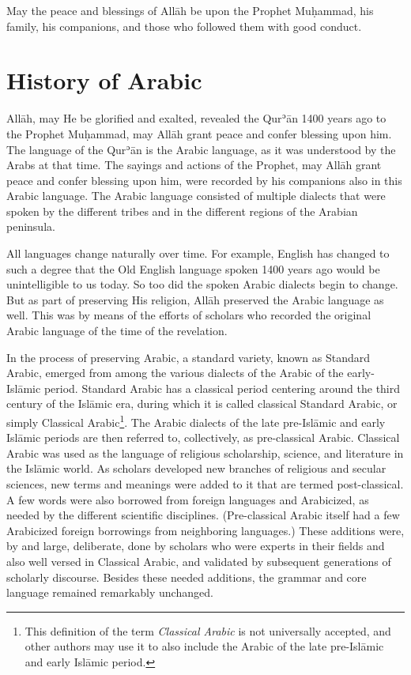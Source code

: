\documentclass[
  10pt,
]{book}
\begin{document}
May the peace and blessings of Allāh be upon the Prophet Muḥammad, his family, his companions, and those who followed them with good conduct.

\section{History of Arabic}\label{history-of-arabic}

Allāh, may He be glorified and exalted, revealed the Qurʾān 1400 years ago to the Prophet Muḥammad, may Allāh grant peace and confer blessing upon him. The language of the Qurʾān is the Arabic language, as it was understood by the Arabs at that time. The sayings and actions of the Prophet, may Allāh grant peace and confer blessing upon him, were recorded by his companions also in this Arabic language. The Arabic language consisted of multiple dialects that were spoken by the different tribes and in the different regions of the Arabian peninsula.

All languages change naturally over time. For example, English has changed to such a degree that the Old English language spoken 1400 years ago would be unintelligible to us today. So too did the spoken Arabic dialects begin to change. But as part of preserving His religion, Allāh preserved the Arabic language as well. This was by means of the efforts of scholars who recorded the original Arabic language of the time of the revelation.

In the process of preserving Arabic, a standard variety, known as Standard Arabic, emerged from among the various dialects of the Arabic of the early-Islāmic period. Standard Arabic has a classical period centering around the third century of the Islāmic era, during which it is called classical Standard Arabic, or simply Classical Arabic\footnote{This definition of the term \emph{Classical Arabic} is not universally accepted, and other authors may use it to also include the Arabic of the late pre-Islāmic and early Islāmic period.}. The Arabic dialects of the late pre-Islāmic and early Islāmic periods are then referred to, collectively, as pre-classical Arabic. Classical Arabic was used as the language of religious scholarship, science, and literature in the Islāmic world. As scholars developed new branches of religious and secular sciences, new terms and meanings were added to it that are termed post-classical. A few words were also borrowed from foreign languages and Arabicized, as needed by the different scientific disciplines. (Pre-classical Arabic itself had a few Arabicized foreign borrowings from neighboring languages.) These additions were, by and large, deliberate, done by scholars who were experts in their fields and also well versed in Classical Arabic, and validated by subsequent generations of scholarly discourse. Besides these needed additions, the grammar and core language remained remarkably unchanged.
\end{document}
